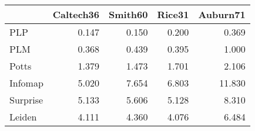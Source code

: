 \begin{tabular}{lrrrr}
\toprule
{} & Caltech36 & Smith60 & Rice31 & Auburn71 \\
\midrule
PLP      &     0.147 &   0.150 &  0.200 &    0.369 \\
PLM      &     0.368 &   0.439 &  0.395 &    1.000 \\
Potts    &     1.379 &   1.473 &  1.701 &    2.106 \\
Infomap  &     5.020 &   7.654 &  6.803 &   11.830 \\
Surprise &     5.133 &   5.606 &  5.128 &    8.310 \\
Leiden   &     4.111 &   4.360 &  4.076 &    6.484 \\
\bottomrule
\end{tabular}
